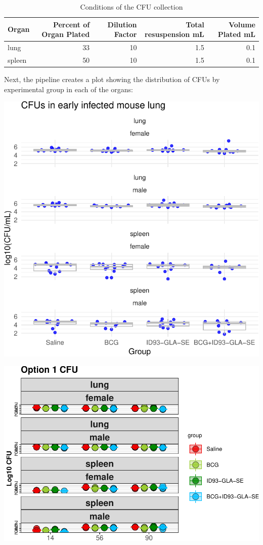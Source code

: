 \documentclass[
]{book}
\begin{document}
\begin{table}

\caption{\label{tab:unnamed-chunk-31}Conditions of the CFU collection}
\centering
\begin{tabular}[t]{l|r|r|r|r}
\hline
Organ & Percent of Organ Plated & Dilution Factor & Total resuspension mL & Volume Plated mL\\
\hline
lung & 33 & 10 & 1.5 & 0.1\\
\hline
spleen & 50 & 10 & 1.5 & 0.1\\
\hline
\end{tabular}
\end{table}

Next, the pipeline creates a plot showing the distribution of CFUs by
experimental group in each of the organs:

\includegraphics{csu-impactb_files/figure-latex/unnamed-chunk-32-1.pdf}

\includegraphics{csu-impactb_files/figure-latex/unnamed-chunk-33-1.pdf}
\end{document}
